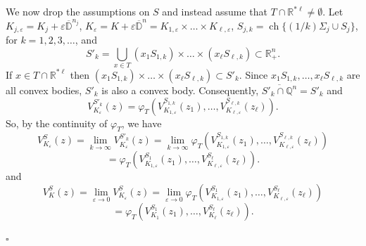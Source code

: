 \documentclass[a4paper,12pt,leqno,english]{article}
\numberwithin{equation}{section}
\newenvironment{prooftx}[1]{\medbreak\noindent{\bf 
    #1:}\rm}{\hfill$\square$\rm}
\begin{document}
\begin{prooftx}{Proof of Theorem \ref{mainresult}}
We now drop the assumptions on $S$ and instead assume that $T \cap \mathbb{R}^{*\ell} \neq \emptyset$.
Let
    $K_{j, \varepsilon} = K_j + \varepsilon \overline{\mathbb{D}}^{n_j}$,
    $K_\varepsilon = K + \varepsilon \overline{\mathbb{D}}^n = K_{1, \varepsilon} \times \dots \times K_{\ell, \varepsilon}$,
    $S_{j, k} = \operatorname{ch}\{(1/k)\Sigma_j \cup S_j\}$, for $k = 1, 2, 3, \dots$, and
\begin{equation*}
    S'_k
    =
    \bigcup_{x \in T} (x_1S_{1, k}) \times \dots \times (x_\ell S_{\ell, k})
    \subset
    \mathbb{R}^n_+.
\end{equation*}
If $x \in T \cap \mathbb{R}^{*\ell}$ then $(x_1 S_{1, k}) \times \dots \times (x_\ell S_{\ell, k}) \subset S'_k$.
Since $x_1S_{1, k}, \dots, x_\ell S_{\ell, k}$ are all convex bodies,
    $S'_k$ is also a convex body.
Consequently, $\overline{S'_k \cap \mathbb{Q}^n} = S'_k$ and
\begin{equation*}
    V^{S'_k}_{K_\varepsilon}(z)
    =
    \varphi_T(
        V^{S_{1, k}}_{K_{1, \varepsilon}}(z_1),
        \dots,
        V^{S_{\ell, k}}_{K_{\ell, \varepsilon}}(z_\ell)
    ).
\end{equation*}
So, by the continuity of $\varphi_T$, we have
\begin{equation*}
    V^S_{K_\varepsilon}(z)
    =
    \lim_{k \rightarrow \infty}
        V^{S'_k}_{K_\varepsilon}(z)
    =
    \lim_{k \rightarrow \infty}
        \varphi_T(
            V^{S_{1, k}}_{K_{1, \varepsilon}}(z_1),
            \dots,
            V^{S_{\ell, k}}_{K_{\ell, \varepsilon}}(z_\ell)
        )
\end{equation*}
\begin{equation*}
    =
    \varphi_T(
        V^{S_1}_{K_{1, \varepsilon}}(z_1),
        \dots,
        V^{S_\ell}_{K_{\ell, \varepsilon}}(z_\ell)
    ).
\end{equation*}
and
\begin{equation*}
    V^S_K(z)
    =
    \lim_{\varepsilon \rightarrow 0}
        V^S_{K_\varepsilon}(z)
    =
    \lim_{\varepsilon \rightarrow 0}
        \varphi_T(
            V^{S_1}_{K_{1, \varepsilon}}(z_1),
            \dots,
            V^{S_\ell}_{K_{\ell, \varepsilon}}(z_\ell)
        )
\end{equation*}
\begin{equation*}
    =
    \varphi_T(
        V^{S_1}_{K_1}(z_1),
        \dots,
        V^{S_\ell}_{K_\ell}(z_\ell)
    ).
\end{equation*}


\end{prooftx}
\end{document}
